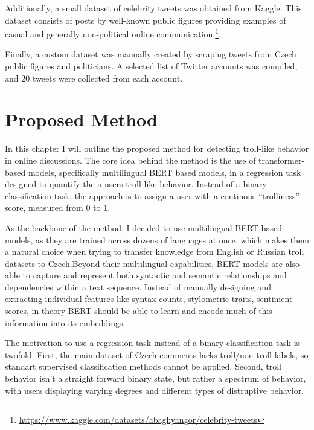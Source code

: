 \documentclass[twoside]{ctuthesis}
\theoremstyle{plain}
\theoremstyle{definition}
\theoremstyle{note}
\begin{document}
Additionally, a small dataset of celebrity tweets was obtained from Kaggle. This dataset consists of posts by well-known public figures providing examples of casual and generally non-political online communication.\footnote{\url{https://www.kaggle.com/datasets/abaghyangor/celebrity-tweets}}.\par

Finally, a custom dataset was manually created by scraping tweets from Czech public figures and politicians. A selected list of Twitter accounts was compiled, and 20 tweets were collected from each account. \par

\chapter{Proposed Method}
In this chapter I will outline the proposed method for detecting troll-like behavior in online discussions. The core idea behind the method is the use of transformer-based models, specifically multilingual BERT based models, in a regression task designed to quantify the a users troll-like behavior. Instead of a binary classification task, the approach is to assign a user with a continous ``trolliness'' score, measured from 0 to 1.\par
As the backbone of the method, I decided to use multilingual BERT based models, as they are trained across dozens of languages at once, which makes them a natural choice when trying to transfer knowledge from English or Russian troll datasets to Czech.Beyond their multilingual capabilities, BERT models are also able to capture and represent both syntactic and semantic relationships and dependencies within a text sequence. Instead of manually designing and extracting individual features like syntax counts, stylometric traits, sentiment scores, in theory BERT should be able to learn and encode much of this information into its embeddings.\cite{Rogers2020}\par
The motivation to use a regression task instead of a binary classification task is twofold. First, the main dataset of Czech comments lacks troll/non-troll labels, so standart supervised classification methods cannot be applied. Second, troll behavior isn't a straight forward binary state, but rather a spectrum of behavior, with users displaying varying degrees and different types of distruptive behavior.\par
\end{document}
